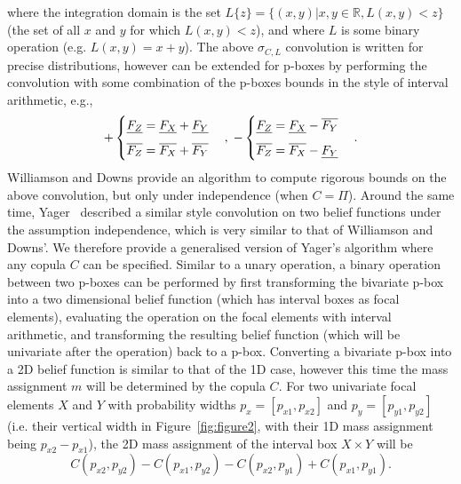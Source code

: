 \documentclass{juliacon}
\begin{document}
where the integration domain is the set $L\{z\} = \{(x,y)| x,y \in \mathbb{R}, L(x,y) < z\}$ (the set of all $x$ and $y$ for which $L(x,y) < z$), and where $L$ is some binary operation (e.g. $L(x,y) = x+y$). The above $\sigma_{C,L}$ convolution is written for precise distributions, however can be extended for p-boxes by performing the convolution with some combination of the p-boxes bounds in the style of interval arithmetic, e.g.,
\begin{eqnarray*}
  + 
  \begin{cases}
    \underline{F_Z} = \underline{F_X} + \underline{F_Y} \vspace{2mm}\\
    \overline{F_Z} = \overline{F_X} + \overline{F_Y}
  \end{cases},\;
  -\begin{cases}
    \underline{F_Z} = \underline{F_X} - \overline{F_Y}\vspace{2mm}\\
    \overline{F_Z} = \overline{F_X} - \underline{F_Y}
  \end{cases} .
\end{eqnarray*}
Williamson and Downs provide an algorithm to compute rigorous bounds on the above convolution, but only under independence (when $C = \Pi$). Around the same time, Yager~\cite{yager1986arithmetic} described a similar style convolution on two belief functions under the assumption independence, which is very similar to that of Williamson and Downs'. We therefore provide a generalised version of Yager's algorithm where any copula $C$ can be specified. Similar to a unary operation, a binary operation between two p-boxes can be performed by first transforming the bivariate p-box into a two dimensional belief function (which has interval boxes as focal elements), evaluating the operation on the focal elements with interval arithmetic, and transforming the resulting belief function (which will be univariate after the operation) back to a p-box. Converting a bivariate p-box into a 2D belief function is similar to that of the 1D case, however this time the mass assignment $m$ will be determined by the copula $C$. For two univariate focal elements $X$ and $Y$ with probability widths $p_{x} = [p_{x1}, p_{x2}]$ and $p_{y} = [p_{y1}, p_{y2}]$ (i.e. their vertical width in Figure~\ref{fig:figure2}, with their 1D mass assignment being $p_{x2} - p_{x1}$), the 2D mass assignment of the interval box $X \times Y$ will be
\begin{equation*}
  C(p_{x2}, p_{y2}) - C(p_{x1}, p_{y2}) - C(p_{x2}, p_{y1}) + C(p_{x1}, p_{y1}) .
\end{equation*}
\end{document}
